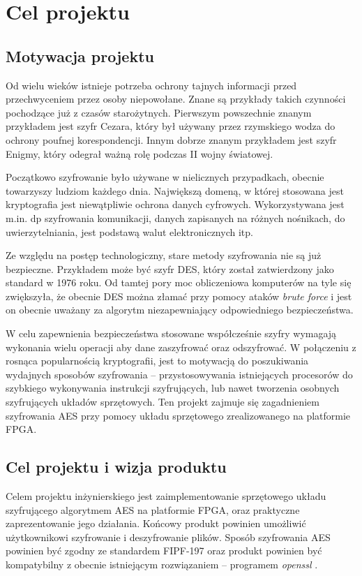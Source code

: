 \section{Cel projektu}
\label{sec:cel-projektu}

\subsection{Motywacja projektu}
Od wielu wieków istnieje potrzeba ochrony tajnych informacji przed przechwyceniem przez osoby niepowołane. Znane są przykłady takich czynności pochodzące już z czasów starożytnych. Pierwszym powszechnie znanym przykładem jest szyfr Cezara, który był używany przez rzymskiego wodza do ochrony poufnej korespondencji. Innym dobrze znanym przykładem jest szyfr Enigmy, który odegrał ważną rolę podczas II wojny światowej.

Początkowo szyfrowanie było używane w nielicznych przypadkach, obecnie towarzyszy ludziom każdego dnia. Największą domeną, w której stosowana jest kryptografia jest niewątpliwie ochrona danych cyfrowych. Wykorzystywana jest m.in. dp szyfrowania komunikacji, danych zapisanych na różnych nośnikach, do uwierzytelniania, jest podstawą walut elektronicznych itp.

Ze względu na postęp technologiczny, stare metody szyfrowania nie są już bezpieczne. Przykładem może być szyfr DES, który został zatwierdzony jako standard w 1976 roku. Od tamtej pory moc obliczeniowa komputerów na tyle się zwiększyła, że obecnie DES można złamać przy pomocy ataków \textit{brute force} i jest on obecnie uważany za algorytm niezapewniający odpowiedniego bezpieczeństwa.

W celu zapewnienia bezpieczeństwa stosowane współcześnie szyfry wymagają wykonania wielu operacji aby dane zaszyfrować oraz odszyfrować. W połączeniu z rosnąca popularnością kryptografii, jest to motywacją do poszukiwania wydajnych sposobów szyfrowania -- przystosowywania istniejących procesorów do szybkiego wykonywania instrukcji szyfrujących, lub nawet tworzenia osobnych szyfrujących układów sprzętowych. Ten projekt zajmuje się zagadnieniem szyfrowania AES przy pomocy układu sprzętowego zrealizowanego na platformie FPGA.

\subsection{Cel projektu i wizja produktu}
Celem projektu inżynierskiego jest zaimplementowanie sprzętowego układu szyfrującego algorytmem AES na platformie FPGA, oraz praktyczne zaprezentowanie jego działania. Końcowy produkt powinien umożliwić użytkownikowi szyfrowanie i deszyfrowanie plików. Sposób szyfrowania AES powinien być zgodny ze standardem FIPF-197 \cite{aes-standard} oraz produkt powinien być kompatybilny z obecnie istniejącym rozwiązaniem -- programem \textit{openssl} \cite{openssl}.

